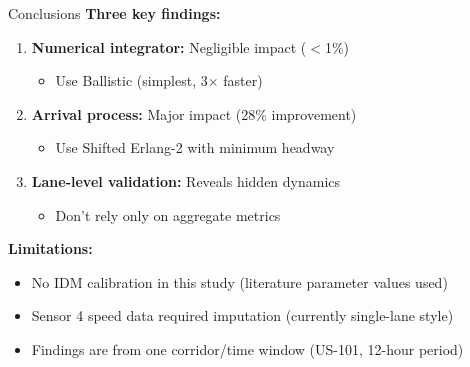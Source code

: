 \documentclass[aspectratio=169]{beamer}
\begin{document}

    \begin{frame}{Conclusions}
        \textbf{Three key findings:}

        \vspace{0.5em}
        \begin{enumerate}
            \item \textbf{Numerical integrator:} Negligible impact ($<$1\%)
            \begin{itemize}
                \item[$\rightarrow$] Use Ballistic (simplest, 3$\times$ faster)
            \end{itemize}

            \vspace{0.5em}
            \item \textbf{Arrival process:} Major impact (28\% improvement)
            \begin{itemize}
                \item[$\rightarrow$] Use Shifted Erlang-2 with minimum headway
            \end{itemize}

            \vspace{0.5em}
            \item \textbf{Lane-level validation:} Reveals hidden dynamics
            \begin{itemize}
                \item[$\rightarrow$] Don't rely only on aggregate metrics
            \end{itemize}
        \end{enumerate}

        \vspace{0.6em}
        \textbf{Limitations:}
        \begin{itemize}
            \item No IDM calibration in this study (literature parameter values used)
            \item Sensor 4 speed data required imputation (currently single-lane style)
            \item Findings are from one corridor/time window (US-101, 12-hour period)
        \end{itemize}


\end{frame}
\end{document}
